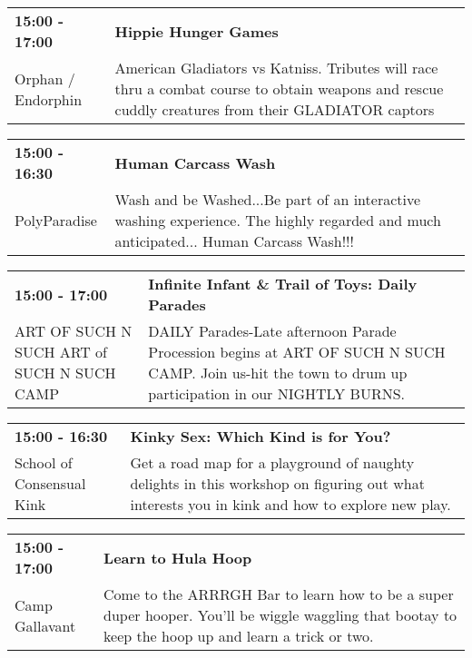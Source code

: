 \begin{tabular}{ p{1in} p{2.2in} }
    \textbf{15:00 - 17:00} & \textbf{Hippie Hunger Games} \\
    Orphan / Endorphin \newline  & American Gladiators vs Katniss. Tributes will race thru a combat course to obtain weapons and rescue cuddly creatures from their GLADIATOR captors \\
    \hline 
\end{tabular}
    
\begin{tabular}{ p{1in} p{2.2in} }
    \textbf{15:00 - 16:30} & \textbf{Human Carcass Wash} \\
    PolyParadise \newline  & Wash and be Washed...Be part of an interactive washing experience.
The highly regarded and much anticipated... Human Carcass Wash!!! \\
    \hline 
\end{tabular}
    
\begin{tabular}{ p{1in} p{2.2in} }
    \textbf{15:00 - 17:00} & \textbf{Infinite Infant \& Trail of Toys: Daily Parades} \\
    ART OF SUCH N SUCH \newline ART of SUCH N SUCH CAMP & DAILY Parades-Late afternoon
Parade Procession begins at ART OF SUCH N SUCH CAMP. Join us-hit the town to drum up participation in our NIGHTLY BURNS. \\
    \hline 
\end{tabular}
    
\begin{tabular}{ p{1in} p{2.2in} }
    \textbf{15:00 - 16:30} & \textbf{Kinky Sex: Which Kind is for You?} \\
    School of Consensual Kink \newline  & Get a road map for a playground of naughty delights in this workshop on figuring out what interests you in kink and how to explore new play. \\
    \hline 
\end{tabular}
    
\begin{tabular}{ p{1in} p{2.2in} }
    \textbf{15:00 - 17:00} & \textbf{Learn to Hula Hoop} \\
    Camp Gallavant \newline  & Come to the ARRRGH Bar to learn how to be a super duper hooper.  You'll be wiggle waggling that bootay to keep the hoop up and learn a trick or two. \\
    \hline 
\end{tabular}
    
